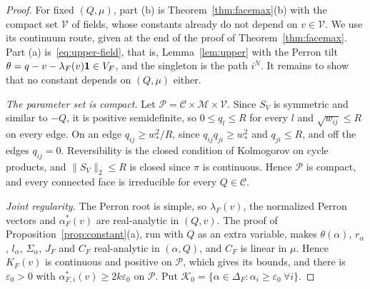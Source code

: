 \begin{proof}
For fixed $(Q,\mu)$, part (b) is Theorem~\ref{thm:facemax}(b) with the compact
set $\mathcal V$ of fields, whose constants already do not depend on
$v\in\mathcal V$. We use its continuum route, given at the end of the proof of
Theorem~\ref{thm:facemax}. Part (a) is~\eqref{eq:upper-field}, that is, Lemma~\ref{lem:upper}
with the Perron tilt $\theta=q-v-\lambda_F(v)\mathbf{1}\in V_F$, and the singleton is
the path $i^N$. It remains to show that no constant depends on $(Q,\mu)$ either.

\emph{The parameter set is compact.} Let $\mathcal P=\mathcal C\times\mathcal M\times\mathcal V$.
Since $S_V$ is symmetric and similar to $-Q$, it is positive semidefinite, so
$0\le q_l\le R$ for every $l$ and $\sqrt{w_{ij}}\le R$ on every edge.
On an edge $q_{ij}\ge w_*^2/R$, since $q_{ij}q_{ji}\ge w_*^2$ and $q_{ji}\le R$, and off the
edges $q_{ij}=0$. Reversibility is the closed condition of Kolmogorov on cycle products,
and $\|S_V\|_2\le R$ is closed since $\pi$ is continuous. Hence $\mathcal P$ is compact, and
every connected face is irreducible for every $Q\in\mathcal C$.

\emph{Joint regularity.} The Perron root is simple, so $\lambda_F(v)$, the normalized
Perron vectors and $\alpha^*_F(v)$ are real-analytic in $(Q,v)$. The proof of
Proposition~\ref{prop:constant}(a), run with $Q$ as an extra variable, makes
$\theta(\alpha)$, $r_\alpha$, $l_\alpha$, $\Sigma_\alpha$, $J_F$ and $C_F$ real-analytic in
$(\alpha,Q)$, and $C_F$ is linear in $\mu$. Hence $K_F(v)$ is continuous and positive on
$\mathcal P$, which gives its bounds, and there is $\varepsilon_0>0$ with
$\alpha^*_{F,i}(v)\ge2k\varepsilon_0$ on $\mathcal P$. Put
$\mathcal K_0=\{\alpha\in\Delta_F:\alpha_i\ge\varepsilon_0\ \forall i\}$.


\end{proof}
